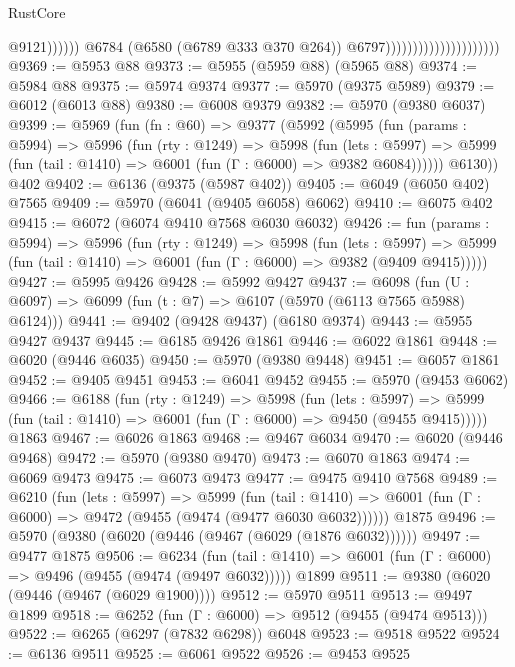 \begin{lexlean}{RustCore}
\begin{coremodule}
                                                          @9121))))))
                                              @6784
                                              (@6580 (@6789 @333 @370 @264))
                                              @6797)))))))))))))))))))))
@9369 := @5953 @88
@9373 := @5955 (@5959 @88) (@5965 @88)
@9374 := @5984 @88
@9375 := @5974 @9374
@9377 := @5970 (@9375 @5989)
@9379 := @6012 (@6013 @88)
@9380 := @6008 @9379
@9382 := @5970 (@9380 @6037)
@9399 := @5969
    (fun (fn : @60) =>
    @9377
      (@5992
        (@5995
          (fun (params : @5994) =>
          @5996
            (fun (rty : @1249) =>
            @5998
              (fun (lets : @5997) =>
              @5999 (fun (tail : @1410) => @6001 (fun (Γ : @6000) => @9382 @6084))))))
        @6130))
    @402
@9402 := @6136 (@9375 (@5987 @402))
@9405 := @6049 (@6050 @402) @7565
@9409 := @5970 (@6041 (@9405 @6058) @6062)
@9410 := @6075 @402
@9415 := @6072 (@6074 @9410 @7568 @6030 @6032)
@9426 := fun (params : @5994) =>
  @5996
    (fun (rty : @1249) =>
    @5998
      (fun (lets : @5997) =>
      @5999 (fun (tail : @1410) => @6001 (fun (Γ : @6000) => @9382 (@9409 @9415)))))
@9427 := @5995 @9426
@9428 := @5992 @9427
@9437 := @6098 (fun (U : @6097) => @6099 (fun (t : @7) => @6107 (@5970 (@6113 @7565 @5988) @6124)))
@9441 := @9402 (@9428 @9437) (@6180 @9374)
@9443 := @5955 @9427 @9437
@9445 := @6185 @9426 @1861
@9446 := @6022 @1861
@9448 := @6020 (@9446 @6035)
@9450 := @5970 (@9380 @9448)
@9451 := @6057 @1861
@9452 := @9405 @9451
@9453 := @6041 @9452
@9455 := @5970 (@9453 @6062)
@9466 := @6188
    (fun (rty : @1249) =>
    @5998
      (fun (lets : @5997) =>
      @5999 (fun (tail : @1410) => @6001 (fun (Γ : @6000) => @9450 (@9455 @9415)))))
    @1863
@9467 := @6026 @1863
@9468 := @9467 @6034
@9470 := @6020 (@9446 @9468)
@9472 := @5970 (@9380 @9470)
@9473 := @6070 @1863
@9474 := @6069 @9473
@9475 := @6073 @9473
@9477 := @9475 @9410 @7568
@9489 := @6210
    (fun (lets : @5997) =>
    @5999
      (fun (tail : @1410) => @6001 (fun (Γ : @6000) => @9472 (@9455 (@9474 (@9477 @6030 @6032))))))
    @1875
@9496 := @5970 (@9380 (@6020 (@9446 (@9467 (@6029 (@1876 @6032))))))
@9497 := @9477 @1875
@9506 := @6234
    (fun (tail : @1410) => @6001 (fun (Γ : @6000) => @9496 (@9455 (@9474 (@9497 @6032)))))
    @1899
@9511 := @9380 (@6020 (@9446 (@9467 (@6029 @1900))))
@9512 := @5970 @9511
@9513 := @9497 @1899
@9518 := @6252 (fun (Γ : @6000) => @9512 (@9455 (@9474 @9513)))
@9522 := @6265 (@6297 (@7832 @6298)) @6048
@9523 := @9518 @9522
@9524 := @6136 @9511
@9525 := @6061 @9522
@9526 := @9453 @9525

\end{coremodule}
\end{lexlean}
